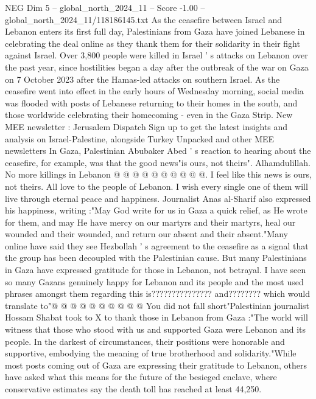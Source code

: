 \begin{textsample}{NEG Dim 5 – global\_north\_2024\_11 – Score -1.00 – global\_north\_2024\_11/118186145.txt}  \label{ex:f5_neg_426}
As the ceasefire between Israel and Lebanon enters its first full day, Palestinians from Gaza have joined Lebanese in celebrating the deal online as they thank them for their solidarity in their fight against Israel.
Over 3,800 people were killed in Israel ' s attacks on Lebanon over the past year, since hostilities began a day after the outbreak of the war on Gaza on 7 October 2023 after the Hamas-led attacks on southern Israel.
As the ceasefire went into effect in the early hours of Wednesday morning, social media was flooded with posts of Lebanese returning to their homes in the south, and those worldwide celebrating their homecoming - even in the Gaza Strip.
New MEE newsletter : Jerusalem Dispatch Sign up to get the latest insights and analysis on Israel-Palestine, alongside Turkey Unpacked and other MEE newsletters In Gaza, Palestinian Abubaker Abed ' s reaction to hearing about the ceasefire, for example, was that the good news"is ours, not theirs".
Alhamdulillah.
No more killings in Lebanon @ @ @ @ @ @ @ @ @ @.
I feel like this news is ours, not theirs.
All love to the people of Lebanon.
I wish every single one of them will live through eternal peace and happiness.
Journalist Anas al-Sharif also expressed his happiness, writing :"May God write for us in Gaza a quick relief, as He wrote for them, and may He have mercy on our martyrs and their martyrs, heal our wounded and their wounded, and return our absent and their absent."Many online have said they see Hezbollah ' s agreement to the ceasefire as a signal that the group has been decoupled with the Palestinian cause.
But many Palestinians in Gaza have expressed gratitude for those in Lebanon, not betrayal.
I have seen so many Gazans genuinely happy for Lebanon and its people and the most used phrases amongst them regarding this is??????????????? and???????? which would translate to"@ @ @ @ @ @ @ @ @ @ You did not fall short"Palestinian journalist Hossam Shabat took to X to thank those in Lebanon from Gaza :"The world will witness that those who stood with us and supported Gaza were Lebanon and its people.
In the darkest of circumstances, their positions were honorable and supportive, embodying the meaning of true brotherhood and solidarity."While most posts coming out of Gaza are expressing their gratitude to Lebanon, others have asked what this means for the future of the besieged enclave, where conservative estimates say the death toll has reached at least 44,250.

\end{textsample}
